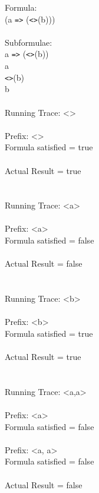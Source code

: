 Formula:\\
(a \texttt{=>} (\texttt{<>}(b)))\\
\\
Subformulae:\\
a \texttt{=>} (\texttt{<>}(b))\\
a\\
\texttt{<>}(b)\\
b\\
\\
Running Trace: \textless \textgreater\\
\\
  Prefix: \textless \textgreater\\
  Formula satisfied = true\\
\\
  Actual Result = true\\
\\
\\
Running Trace: \textless a\textgreater\\
\\
  Prefix: \textless a\textgreater\\
  Formula satisfied = false\\
\\
  Actual Result = false\\
\\
\\
Running Trace: \textless b\textgreater\\
\\
  Prefix: \textless b\textgreater\\
  Formula satisfied = true\\
\\
  Actual Result = true\\
\\
\\
Running Trace: \textless a,a\textgreater\\
\\
  Prefix: \textless a\textgreater\\
  Formula satisfied = false\\
\\
  Prefix: \textless a, a\textgreater\\
  Formula satisfied = false\\
\\
  Actual Result = false\\

